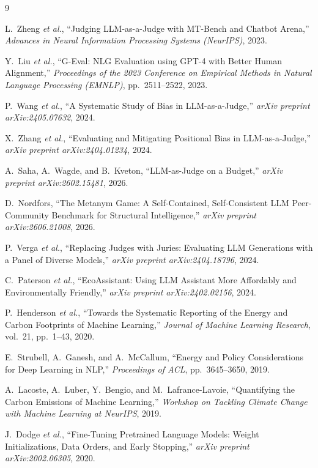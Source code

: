 \documentclass[11pt, a4paper]{article}
\begin{document}
\begin{thebibliography}{9}

L.~Zheng \textit{et al.},
``Judging LLM-as-a-Judge with MT-Bench and Chatbot Arena,''
\textit{Advances in Neural Information Processing Systems (NeurIPS)}, 2023.

Y.~Liu \textit{et al.},
``G-Eval: NLG Evaluation using GPT-4 with Better Human Alignment,''
\textit{Proceedings of the 2023 Conference on Empirical Methods in Natural
Language Processing (EMNLP)}, pp.~2511--2522, 2023.

P.~Wang \textit{et al.},
``A Systematic Study of Bias in LLM-as-a-Judge,''
\textit{arXiv preprint arXiv:2405.07632}, 2024.

X.~Zhang \textit{et al.},
``Evaluating and Mitigating Positional Bias in LLM-as-a-Judge,''
\textit{arXiv preprint arXiv:2404.01234}, 2024.

A.~Saha, A.~Wagde, and B.~Kveton,
``LLM-as-Judge on a Budget,''
\textit{arXiv preprint arXiv:2602.15481}, 2026.

D.~Nordfors,
``The Metanym Game: A Self-Contained, Self-Consistent LLM Peer-Community
Benchmark for Structural Intelligence,''
\textit{arXiv preprint arXiv:2606.21008}, 2026.

P.~Verga \textit{et al.},
``Replacing Judges with Juries: Evaluating LLM Generations with a Panel of
Diverse Models,''
\textit{arXiv preprint arXiv:2404.18796}, 2024.

C.~Paterson \textit{et al.},
``EcoAssistant: Using LLM Assistant More Affordably and Environmentally
Friendly,'' \textit{arXiv preprint arXiv:2402.02156}, 2024.

P.~Henderson \textit{et al.},
``Towards the Systematic Reporting of the Energy and Carbon Footprints of
Machine Learning,'' \textit{Journal of Machine Learning Research}, vol.~21,
pp.~1--43, 2020.

E.~Strubell, A.~Ganesh, and A.~McCallum,
``Energy and Policy Considerations for Deep Learning in NLP,''
\textit{Proceedings of ACL}, pp.~3645--3650, 2019.

A.~Lacoste, A.~Luber, Y.~Bengio, and M.~Lafrance-Lavoie,
``Quantifying the Carbon Emissions of Machine Learning,''
\textit{Workshop on Tackling Climate Change with Machine Learning at
NeurIPS}, 2019.

J.~Dodge \textit{et al.},
``Fine-Tuning Pretrained Language Models: Weight Initializations, Data
Orders, and Early Stopping,'' \textit{arXiv preprint arXiv:2002.06305}, 2020.

\end{thebibliography}
\end{document}

